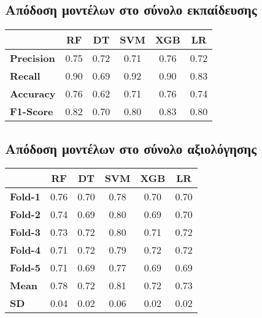 \documentclass[diploma]{softlab-thesis}
\begin{document}
\begin{enumerate}
\begin{enumerate}
\subsection{Απόδοση μοντέλων στο σύνολο εκπαίδευσης}

\begin{table}[H]
\centering
\begin{tabular}{|l|c|c|c|c|c|}
\hline
       & \textbf{RF} & \textbf{DT} & \textbf{SVM} & \textbf{XGB} & \textbf{LR} \\ \hline
\textbf{Precision} & 0.75        & 0.72        & 0.71         & 0.76         & 0.72        \\ \hline
\textbf{Recall}    & 0.90        & 0.69        & 0.92         & 0.90         & 0.83        \\ \hline
\textbf{Accuracy}  & 0.76        & 0.62        & 0.71         & 0.76         & 0.74        \\ \hline
\textbf{F1-Score}  & 0.82        & 0.70        & 0.80         & 0.83         & 0.80        \\ \hline
\end{tabular}
\end{table}


\subsection{Απόδοση μοντέλων στο σύνολο αξιολόγησης}


\begin{table}[H]
\centering

\begin{tabular}{|l|c|c|c|c|c|}
\hline
                & \textbf{RF} & \textbf{DT} & \textbf{SVM} & \textbf{XGB} & \textbf{LR} \\ \hline
\textbf{Fold-1} &    0.76         &     0.70        &    0.78          &    0.70          &    0.70       \\ \hline
\textbf{Fold-2} &     0.74        &       0.69      &     0.80         &       0.69       &     0.70        \\ \hline
\textbf{Fold-3} &     0.73        &      0.72       &        0.80      &    0.71          &     0.72        \\ \hline
\textbf{Fold-4} &     0.71        &     0.72        &      0.79        &     0.72         &    0.72         \\ \hline
\textbf{Fold-5} &     0.71        &         0.69    &      0.77        &        0.69      &      0.69       \\ \hline
\textbf{Mean}   &      0.78       &      0.72       &      0.81        &       0.72       &    0.73         \\ \hline
\textbf{SD}     &     0.04        &     0.02        &     0.06         &        0.02      &      0.02       \\ \hline
\end{tabular}
\end{table}


\end{enumerate}
\end{enumerate}
\end{document}
